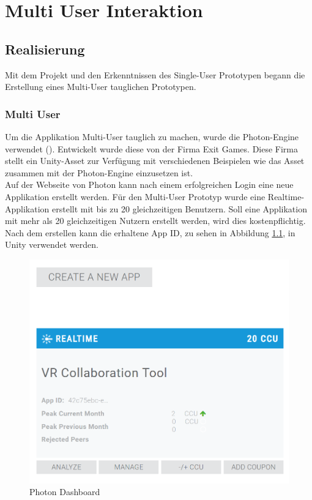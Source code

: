 \chapter{Multi User Interaktion}
\label{ch:Multi_User_Interaktion}

\section{Realisierung}
Mit dem Projekt und den Erkenntnissen des Single-User Prototypen begann die Erstellung eines Multi-User tauglichen Prototypen.

\subsection{Multi User}
\label{ch:multi_user}
Um die Applikation Multi-User tauglich zu machen, wurde die Photon-Engine verwendet (\cite{noauthor_photon_2019}). Entwickelt wurde diese von der Firma Exit Games. Diese Firma stellt ein Unity-Asset zur Verfügung mit verschiedenen Beispielen wie das Asset zusammen mit der Photon-Engine einzusetzen ist. \\

\noindent Auf der Webseite von Photon kann nach einem erfolgreichen Login eine neue Applikation erstellt werden. Für den Multi-User Prototyp wurde eine Realtime-Applikation erstellt mit bis zu 20 gleichzeitigen Benutzern. Soll eine Applikation mit mehr als 20 gleichzeitigen Nutzern erstellt werden, wird dies kostenpflichtig. Nach dem erstellen kann die erhaltene App ID, zu sehen in Abbildung \ref{fig:photon_dashboard}, in Unity verwendet werden.

\begin{figure}[h!]
	\centering
	\includegraphics[keepaspectratio,width=0.4\linewidth]{img/Photon_Dashboard.PNG}
	\caption{Photon Dashboard}
	\label{fig:photon_dashboard}
\end{figure} 

